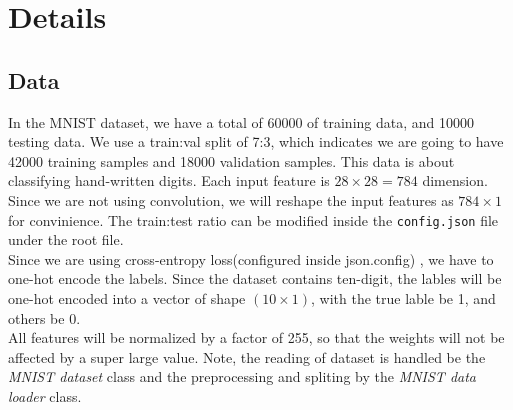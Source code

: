 \documentclass{article}
\begin{document}
\section{Details}
    \subsection{Data}
        In the MNIST dataset, we have a total of 60000 of training data, and 
        10000 testing data. We use a train:val split of 7:3, which indicates we 
        are going to have 42000 training samples and 18000 validation samples.
        This data is about classifying hand-written digits.
        Each input feature is $28 \times 28 = 784$ dimension. Since we are
        not using convolution, we will reshape the input features as $784 \times 1$ for convinience.
        The train:test ratio can be modified inside the \verb|config.json| 
        file under the root file. \\
        \indent Since we are using cross-entropy loss(configured inside json.config)
        , we have to one-hot encode the labels. Since the dataset contains ten-digit, 
        the lables will be one-hot encoded into a vector of shape $(10 \times 1)$,
        with the true lable be 1, and others be 0.\\
        \indent All features will be normalized by a factor of 255, so that the
        weights will not be affected by a super large value. Note, the reading
        of dataset is handled be the \emph{MNIST dataset} class and the preprocessing
        and spliting by the \emph{MNIST data loader} class.
\end{document}
